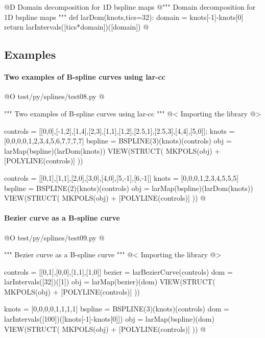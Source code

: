 \documentclass[11pt,oneside]{article}	%
\begin{document}
@D Domain decomposition for 1D bspline maps
@{""" Domain decomposition for 1D bspline maps """
def larDom(knots,tics=32): 
	domain = knots[-1]-knots[0]
	return larIntervals([tics*domain])([domain])
@}

\subsection{Examples}

\paragraph{Two examples of B-spline curves using lar-cc}

@O test/py/splines/test08.py
@{""" Two examples of B-spline curves using lar-cc """
@< Importing the library @>

controls = [[0,0],[-1,2],[1,4],[2,3],[1,1],[1,2],[2.5,1],[2.5,3],[4,4],[5,0]];
knots = [0,0,0,0,1,2,3,4,5,6,7,7,7,7]
bspline = BSPLINE(3)(knots)(controls)
obj = larMap(bspline)(larDom(knots))
VIEW(STRUCT( MKPOLS(obj) + [POLYLINE(controls)] ))

controls = [[0,1],[1,1],[2,0],[3,0],[4,0],[5,-1],[6,-1]]
knots = [0,0,0,1,2,3,4,5,5,5]
bspline = BSPLINE(2)(knots)(controls)
obj = larMap(bspline)(larDom(knots))
VIEW(STRUCT( MKPOLS(obj) + [POLYLINE(controls)] ))
@}


\paragraph{Bezier curve as a B-spline curve}

@O test/py/splines/test09.py
@{""" Bezier curve as a B-spline curve """
@< Importing the library @>

controls = [[0,1],[0,0],[1,1],[1,0]]
bezier = larBezierCurve(controls)
dom = larIntervals([32])([1])
obj = larMap(bezier)(dom)
VIEW(STRUCT( MKPOLS(obj) + [POLYLINE(controls)] ))

knots = [0,0,0,0,1,1,1,1]
bspline = BSPLINE(3)(knots)(controls)
dom = larIntervals([100])([knots[-1]-knots[0]])
obj = larMap(bspline)(dom)
VIEW(STRUCT( MKPOLS(obj) + [POLYLINE(controls)] ))
@}
\end{document}

